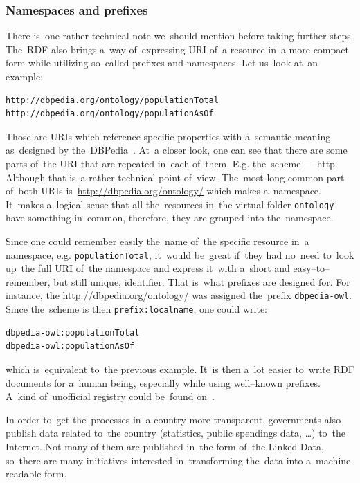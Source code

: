 \subsubsection{Namespaces and prefixes}

There is~one rather technical note we~should mention before taking further steps. The~RDF
also brings a~way of~expressing URI of~a resource in~a more compact form while utilizing
so--called prefixes and namespaces. Let us~look at~an example:

\scriptsize\begin{verbatim}
http://dbpedia.org/ontology/populationTotal
http://dbpedia.org/ontology/populationAsOf
\end{verbatim}\normalsize

Those are URIs which reference specific properties with a~semantic meaning as~designed
by the~DBPedia~\cite{dbpedia}. At~a closer look, one can see that there are some parts of~the URI
that are repeated in~each of~them. E.g. the~scheme --- http. Although that is~a rather technical
point of~view. The~most long common part of~both URIs is~\url{http://dbpedia.org/ontology/}
which makes a~namespace. It~makes a~logical sense that all the~resources in~the virtual
folder \texttt{ontology} have something in~common, therefore, they are grouped into the~namespace.

Since one could remember easily the~name of~the specific resource in~a namespace,
e.g. \texttt{populationTotal}, it~would be~great if~they had no~need to~look up~the full
URI of~the namespace and express it~with a~short and easy--to--remember, but still 
unique, identifier. That is~what prefixes are designed for. For instance, the
\url{http://dbpedia.org/ontology/} was assigned the~prefix \texttt{dbpedia-owl}. Since the~scheme
is then \texttt{prefix:localname}, one could write:

\scriptsize\begin{verbatim}
dbpedia-owl:populationTotal
dbpedia-owl:populationAsOf
\end{verbatim}\normalsize

which is~equivalent to~the previous example. It~is then a~lot easier to~write RDF
documents for a~human being, especially while using well--known prefixes. A~kind of~unofficial
registry could be~found on~\cite{prefixcc}.

In order to~get the~processes in~a country more transparent, governments also publish data
related to~the country (statistics, public spendings data, …) to~the Internet. Not many of
them are published in~the form of~the Linked Data, so~there are many initiatives
interested in~transforming the~data into a~machine-readable form.


